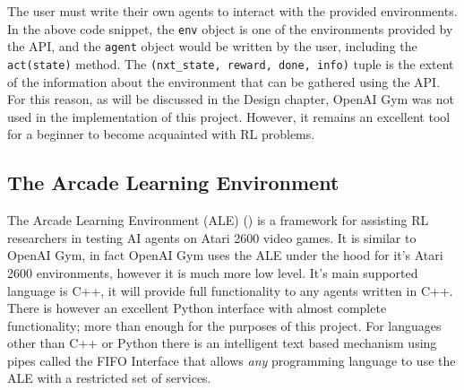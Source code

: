 The user must write their own agents to interact with the provided environments. In the above code snippet, the \texttt{env} object is one of the environments provided by the API, and the \texttt{agent} object would be written by the user, including the \texttt{act(state)} method. The \texttt{(nxt\_state, reward, done, info)} tuple is the extent of the information about the environment that can be gathered using the API. For this reason, as will be discussed in the Design chapter, OpenAI Gym was not used in the implementation of this project. However, it remains an excellent tool for a beginner to become acquainted with RL problems.

\subsection{The Arcade Learning Environment}
The Arcade Learning Environment (ALE) (\citet{ale-eval-plat}) is a framework for assisting RL researchers in testing AI agents on Atari 2600 video games. It is similar to OpenAI Gym, in fact OpenAI Gym uses the ALE under the hood for it's Atari 2600 environments, however it is much more low level. It's main supported language is C++, it will provide full functionality to any agents written in C++. There is however an excellent Python interface with almost complete functionality; more than enough for the purposes of this project. For languages other than C++ or Python there is an intelligent text based mechanism using pipes called the FIFO Interface that allows \textit{any} programming language to use the ALE with a restricted set of services. \paragraph{}

